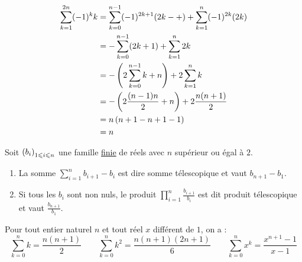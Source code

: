 \begin{corr}
	\begin{align*}
		\sum_{k=1}^{2n} (-1)^k k & = \sum_{k=0}^{n-1} (-1)^{2k+1} (2k-+) + \sum_{k=1}^{n} (-1)^{2k} (2k) \\
		                         & = -\sum_{k=0}^{n-1} (2k+1) + \sum_{k=1}^{n} 2k                        \\
		                         & = -\left(2\sum_{k=0}^{n-1} k + n\right) + 2\sum_{k=1}^{n} k                \\
		                         & = -\left(2\frac{(n-1)n}{2} + n\right) + 2\frac{n(n+1)}{2}                  \\
		                         & = n\left(n+1-n+1-1\right)                                                  \\
		                         & = n                                                                   \\
	\end{align*}
\end{corr}
\begin{defprop}[téléscopage]
	Soit \(\left(b_i\right)_{1 \leqslant i \leqslant n}\) une famille \underline{finie} de réels avec \(n\) supérieur ou égal à \(2\).
	\begin{enumerate}
		\item La somme \(\sum_{i=1}^n b_{i+1}-b_i\) est dire somme télescopique et vaut \(b_{n+1}-b_1\).
		\item Si tous les \(b_i\) sont non nuls, le produit \(\prod_{i=1}^n \frac{b_{i+1}}{b_i}\) est dit produit télescopique et vaut \(\frac{b_{n+1}}{b_1}\).
	\end{enumerate}
\end{defprop}

\begin{defprop}
	Pour tout entier naturel \(n\) et tout réel \(x\) différent de \(1\), on a :
	\[\sum_{k=0}^n k = \frac{n(n+1)}{2} \qquad \sum_{k=0}^n k^2 = \frac{n(n+1)(2n+1)}{6} \qquad \sum_{k=0}^n x^k = \frac{x^{n+1}-1}{x-1}\]
\end{defprop}

